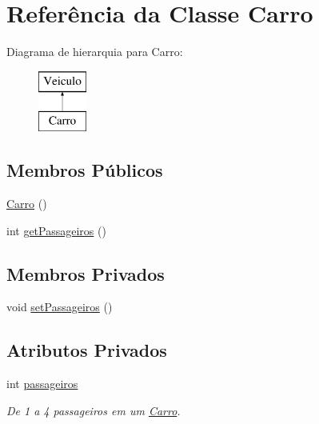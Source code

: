 \hypertarget{class_carro}{}\section{Referência da Classe Carro}
\label{class_carro}
Diagrama de hierarquia para Carro\+:\begin{figure}[H]
\begin{center}
\leavevmode
\includegraphics[height=2.000000cm]{class_carro}
\end{center}
\end{figure}
\subsection*{Membros Públicos}
\begin{DoxyCompactItemize}
\item 
\mbox{\hyperlink{class_carro_a853f79365b5c36491d34cf8f3815f75e}{Carro}} ()
\item 
int \mbox{\hyperlink{class_carro_a5c4e195d2148e78186532d315630a7a1}{get\+Passageiros}} ()
\end{DoxyCompactItemize}
\subsection*{Membros Privados}
\begin{DoxyCompactItemize}
\item 
void \mbox{\hyperlink{class_carro_a154dc6a973a0b8e345bffcdfd4721615}{set\+Passageiros}} ()
\end{DoxyCompactItemize}
\subsection*{Atributos Privados}
\begin{DoxyCompactItemize}
\item 
\mbox{\label{class_carro_af752fd9ef168621245eb8c3d4eee45e1}} 
int \mbox{\hyperlink{class_carro_af752fd9ef168621245eb8c3d4eee45e1}{passageiros}}
\begin{DoxyCompactList}\small\item\em De 1 a 4 passageiros em um \mbox{\hyperlink{class_carro}{Carro}}. \end{DoxyCompactList}\end{DoxyCompactItemize}
